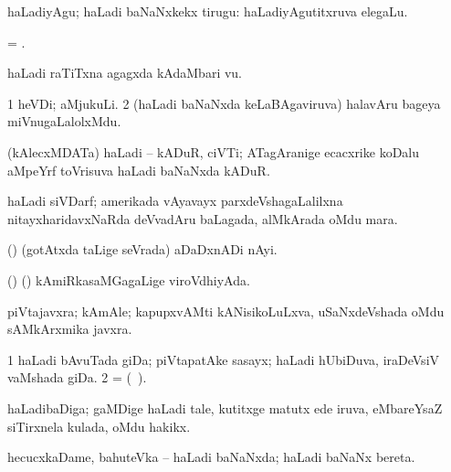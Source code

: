 \noindent
\gl{\akirx} 
\bmng
haLadiyAgu; haLadi baNaNxkekx tirugu:  haLadiyAgutitxruva elegaLu.
\emng
\eentry

\bentry
{}
\gl{\nA} 
\bmng
= .
\emng
\eentry

\bentry
{} 
\gl{\nA} 
\bmng
haLadi raTiTxna agagxda kAdaMbari \mo vu.
\emng
\eentry

\bentry
{} 
\gl{\nA} 
\bmng
\bnum
\num{1} heVDi; aMjukuLi. 
\num{2} (haLadi baNaNxda keLaBAgaviruva) halavAru bageya miVnugaLalolxMdu.
\enum
\emng 
\eentry

\bentry
{}
\gl{\nA} 
\bmng
(kAlecxMDATa) haLadi -- kADuR, ciVTi; ATagAranige ecacxrike koDalu aMpeYrf toVrisuva haLadi baNaNxda kADuR.
\emng
\eentry

\bentry
{}
\gl{\nA} 
\bmng
haLadi siVDarf; amerikada vAyavayx parxdeVshagaLalilxna nitayxharidavxNaRda deVvadAru baLagada, alMkArada oMdu mara.
\emng
\eentry

\bentry
{} 
\gl{\nA} 
\bmng
(\ame)
(gotAtxda taLige seVrada) aDaDxnADi nAyi.
\emng
\eentry

\bentry
{} 
\gl{\gu} 
\bmng
(\ame) (\rUpa) 
kAmiRkasaMGagaLige viroVdhiyAda.
\emng
\eentry

\bentry
{}
\gl{\nA} 
\bmng
piVtajavxra; kAmAle; kapupxvAMti kANisikoLuLxva,  uSaNxdeVshada oMdu  sAMkArxmika javxra.
\emng
\eentry

\bentry
{}
\gl{\nA} 
\bmng
\bnum
\num{1} haLadi bAvuTada giDa; piVtapatAke sasayx; haLadi hUbiDuva, iraDeVsiV vaMshada giDa. 
\num{2} =  (\pagu\ ).
\enum
\emng
\eentry

\bentry
{} 
\gl{\nA} 
\bmng
haLadibaDiga; gaMDige haLadi tale, kutitxge matutx ede iruva, eMbareYsaZ siTirxnela kulada, oMdu hakikx.
\emng 
\eentry

\bentry
{} 
\gl{\gu} 
\bmng
hecucxkaDame, bahuteVka -- haLadi baNaNxda; haLadi baNaNx bereta.
\emng
\eentry

